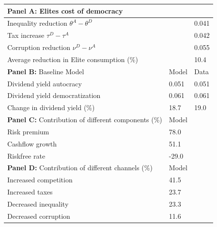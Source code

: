 
\begin{tabularx}{\linewidth}{@{ } l*{2}{Y} @{ }}
\toprule
\textbf{Panel A:} Elites cost of democracy &  &  \\
\hline \addlinespace
Inequality reduction $\theta^A - \theta^D$   &  & 0.041   \\
\addlinespace
Tax increase $\tau^D-\tau^A$  & & 0.042   \\
\addlinespace
Corruption reduction $\nu^D- \nu^A$  & & 0.055   \\
\addlinespace
Average reduction in Elite consumption (\%)  & & 10.4   \\
\addlinespace  \hline
\textbf{Panel B:} Baseline Model & Model  & Data  \\  \hline
\addlinespace
Dividend yield autocracy  &  0.051  & 0.051  \\
\addlinespace
Dividend yield democratization  &  0.061  & 0.061  \\
\addlinespace
Change in dividend yield (\%)  & 18.7  & 19.0  \\
\addlinespace  \hline
\textbf{Panel C:} Contribution of different components (\%) & Model  &   \\  \hline
\addlinespace
Risk premium  & 78.0  &   \\
\addlinespace
Cashflow growth & 51.1  &  \\
\addlinespace
Riskfree rate  & -29.0  &  \\
\addlinespace  \hline
\textbf{Panel D:} Contribution of different channels (\%) & Model  &   \\  \hline
\addlinespace
Increased competition  & 41.5  &   \\
\addlinespace
Increased taxes & 23.7  &  \\
\addlinespace
Decreased inequality  & 23.3  &  \\
\addlinespace
Decreased corruption  & 11.6  &  \\
\bottomrule
\end{tabularx}
